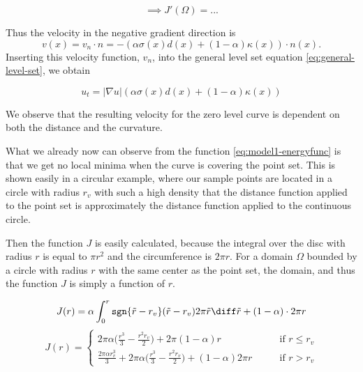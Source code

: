 
\begin{equation}
    \implies J'(\Omega) = ...
\end{equation}

Thus the velocity in the negative gradient direction is
\begin{equation}
    v(x) = v_n \cdot n = -(\alpha\sigma(x) d(x) + (1-\alpha) \kappa(x))\cdot n(x).
    \label{eq:model1-velocity}
\end{equation}
Inserting this velocity function, $v_n$, into the general level set equation \eqref{eq:general-level-set}, we obtain 

\begin{tcolorbox}[title=Model 1]
\begin{equation}
    u_t = |\nabla u|(\alpha\sigma(x) d(x) + (1-\alpha) \kappa(x))
    \label{eq:model1-pde}
\end{equation} 
\end{tcolorbox}












We observe that the resulting velocity for the zero level curve is dependent on both the distance and the curvature. 

What we already now can observe from the function \eqref{eq:model1-energyfunc} is that we get no local minima when the curve is covering the point set. This is shown easily in a circular example, where our sample points are located in a circle with radius $r_v$ with such a high density that the distance function applied to the point set is approximately the distance function applied to the continuous circle. 

Then the function $J$ is easily calculated, because the integral over the disc with radius $r$ is equal to $\pi r^2$ and the circumference is $2\pi r$. For a domain $\Omega$ bounded by a circle with radius $r$ with the same center as the point set, the domain, and thus the function $J$ is simply a function of $r$.

\begin{equation*}
    J(r) = \alpha \int_0^{r} \texttt{sgn}\{\tilde{r}-r_v\} (\tilde{r}-r_v) 2\pi \tilde{r} \diff \tilde{r} + (1-\alpha)\cdot 2\pi r 
\end{equation*}
\begin{equation}
    J(r) = \begin{cases}
        2\pi \alpha \bigg( \frac{r^3}{3}- \frac{r^2 r_v}{2} \bigg) + 2\pi (1-\alpha) r &\qquad \text{if } r\leq r_v\\
        \frac{2\pi \alpha r_v^3}{3} + 2\pi \alpha \bigg( \frac{r^3}{3}- \frac{r^2 r_v}{2} \bigg) + (1-\alpha) 2\pi r &\qquad \text{if } r>r_v
        \end{cases}
    \label{eq:J-rad}
\end{equation}

